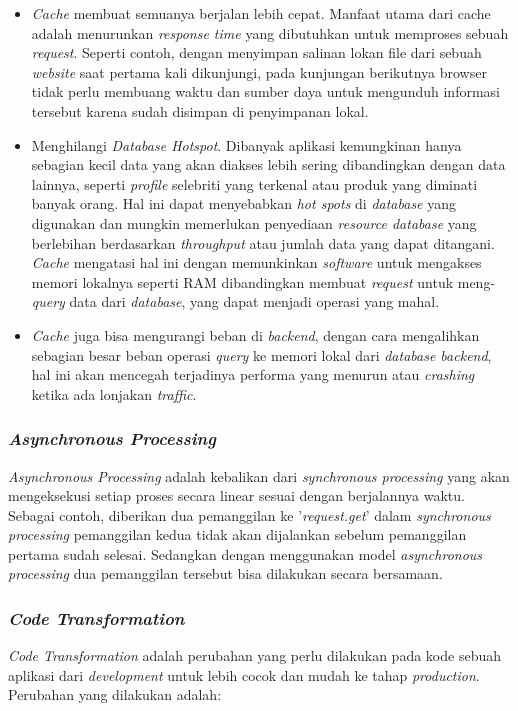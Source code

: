 \documentclass[a4paper]{article}
\newcommand{\subsubbab}[1]{%
    \subsubsection{#1}%
}
\begin{document}
\begin{itemize}
    \item \textit{Cache} membuat semuanya berjalan lebih cepat. Manfaat utama dari cache adalah menurunkan \textit{response time} yang dibutuhkan untuk memproses sebuah \textit{request}. Seperti contoh, dengan menyimpan salinan lokan file dari sebuah \textit{website} saat pertama kali dikunjungi, pada kunjungan berikutnya browser tidak perlu membuang waktu dan sumber daya untuk mengunduh informasi tersebut karena sudah disimpan di penyimpanan lokal\autocite{businessinsider_cache}.

    \item Menghilangi \textit{Database Hotspot}. Dibanyak aplikasi kemungkinan hanya sebagian kecil data yang akan diakses lebih sering dibandingkan dengan data lainnya, seperti \textit{profile} selebriti yang terkenal atau produk yang diminati banyak orang. Hal ini dapat menyebabkan \textit{hot spots} di \textit{database} yang digunakan dan mungkin memerlukan penyediaan \textit{resource database} yang berlebihan berdasarkan \textit{throughput} atau jumlah data yang dapat ditangani\autocite{AWS-caching}. \textit{Cache} mengatasi hal ini dengan memunkinkan \textit{software} untuk mengakses memori lokalnya seperti RAM dibandingkan membuat \textit{request} untuk meng-\textit{query} data dari \textit{database}, yang dapat menjadi operasi yang mahal.

    \item \textit{Cache} juga bisa mengurangi beban di \textit{backend}, dengan cara mengalihkan sebagian besar beban operasi \textit{query} ke memori lokal dari \textit{database backend}, hal ini akan mencegah terjadinya performa yang menurun atau \textit{crashing} ketika ada lonjakan \textit{traffic}.
\end{itemize}



\subsubbab{\textit{Asynchronous Processing}}
\textit{Asynchronous Processing} adalah kebalikan dari \textit{synchronous processing} yang akan mengeksekusi setiap proses secara linear sesuai dengan berjalannya waktu. Sebagai contoh, diberikan dua pemanggilan ke '\textit{request.get}' dalam \textit{synchronous processing} pemanggilan kedua tidak akan dijalankan sebelum pemanggilan pertama sudah selesai. Sedangkan dengan menggunakan model \textit{asynchronous processing} dua pemanggilan tersebut bisa dilakukan secara bersamaan\autocite{Williams_Benfield_Warner_Zadka_Mitchell_Samuel_Tardy_2019}.

\subsubbab{\textit{Code Transformation}}
\textit{Code Transformation} adalah perubahan yang perlu dilakukan pada kode sebuah aplikasi dari \textit{development} untuk lebih cocok dan mudah ke tahap \textit{production}\autocite{Nextjs_compiler}. Perubahan yang dilakukan adalah:
\end{document}
